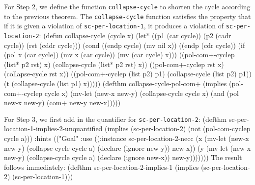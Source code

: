 \documentclass[]{eptcs}
\newenvironment{qv}
{\quote\Verbatim}
{\endVerbatim\endquote}
\begin{document}
For Step 2, we define the function \verb|collapse-cycle| to shorten the cycle according to the previous theorem. The \verb|collapse-cycle| function satisfies the property that if it is given a violation of \linebreak\verb|sc-per-location-1|, it produces a violation of \verb|sc-per-location-2|:
\begin{qv}
(defun collapse-cycle (cycle x)
  (let* ((p1 (car cycle))
         (p2 (cadr cycle))
         (rst (cddr cycle)))
    (cond ((endp cycle) (mv nil x))
          ((endp (cdr cycle))
           (if (pol x (car cycle))
               (mv x (car cycle))
             (mv (car cycle) x)))
          ((pol-com+-cyclep (list* p2 rst) x)
           (collapse-cycle (list* p2 rst) x))
          ((pol-com+-cyclep rst x)
           (collapse-cycle rst x))
          ((pol-com+-cyclep (list p2) p1)
           (collapse-cycle (list p2) p1))
          (t (collapse-cycle (list p1) x)))))
(defthm collapse-cycle-pol-com+
  (implies (pol-com+-cyclep cycle x)
           (mv-let (new-x new-y)
                   (collapse-cycle cycle x)
                   (and (pol new-x new-y)
                        (com+ new-y new-x)))))
\end{qv}

For Step 3, we first add in the quantifier for \verb|sc-per-location-2|:
\begin{qv}
(defthm sc-per-location-1-implies-2-unquantified
  (implies (sc-per-location-2)
           (not (pol-com-cyclep cycle a)))
  :hints (("Goal"
           :use ((:instance sc-per-location-2-necc
                            (x (mv-let (new-x new-y)
                                       (collapse-cycle cycle a)
                                       (declare (ignore new-y))
                                       new-x))
                            (y (mv-let (new-x new-y)
                                       (collapse-cycle cycle a)
                                       (declare (ignore new-x))
                                       new-y)))))))
\end{qv}
The result follows immediately:
\begin{qv}
(defthm sc-per-location-2-implies-1
  (implies (sc-per-location-2)
           (sc-per-location-1)))
\end{qv}
\end{document}
